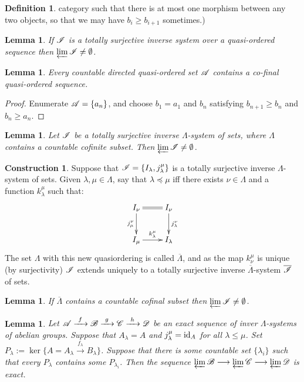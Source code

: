 \documentclass[11pt]{article}
\theoremstyle{plain}
\newtheorem{lem}[thm]{Lemma}
\theoremstyle{definition}
\newtheorem{const}[thm]{Construction}
\newtheorem{defn}[thm]{Definition}
\begin{document}
{\begin{defn}
category such that there is at most one morphism between any two objects, so
that we may have $b_i\geq b_{i+1}$ sometimes.)
\end{defn}
\begin{lem}
If $\mathscr{I}$ is a totally surjective inverse system over a quasi-ordered sequence
then $\varprojlim\mathscr{I}\neq\emptyset$.
\end{lem}
\begin{lem}
Every countable directed quasi-ordered set $\mathscr{A}$ contains a co-final
quasi-ordered sequence.
\end{lem}
\begin{proof}
Enumerate $\mathscr{A}=\{a_n\}$, and choose $b_1=a_1$ and $b_n$ satisfying
$b_{n+1}\geq b_n$ and $b_n\geq a_n$.
\end{proof}
\begin{lem}
Let $\mathscr{I}$ be a totally surjective inverse $\Lambda$-system of sets, where
$\Lambda$ contains a countable cofinite subset. Then
$\varprojlim\mathscr{I}\neq\emptyset$.
\end{lem}
\begin{const}
Suppose that $\mathscr{I}=\{I_\lambda,j_\lambda^\mu\}$ is a totally surjective inverse
$\Lambda$-system of sets. Given $\lambda,\mu\in\Lambda$, say that
$\lambda\preceq\mu$ iff there exists $\nu\in\Lambda$ and a function
$k^\mu_\lambda$ such that:
\[\xymatrix{
I_\nu\ar[d]_{j^\nu_\mu}&I_\nu\ar@{=}[l]\ar[d]^{j^\nu_\lambda}\\
I_\mu\ar[r]^{k_\lambda^\mu}&I_\lambda
}\]
The set $\Lambda$ with this new quasiordering is called $\overline\Lambda$, and
as the map $k^\mu_\nu$ is unique (by surjectivity) $\mathscr{I}$ extends uniquely to a
totally surjective inverse $\overline\Lambda$-system $\overline{\mathscr{I}}$ of sets.
\end{const}
\begin{lem}
If $\overline\Lambda$ contains a countable cofinal subset then
$\varprojlim\mathscr{I}\neq\emptyset$.
\end{lem}
\begin{lem}
Let $\scrA\xrightarrow{\ f\ }\scrB\xrightarrow{\ g\ }\scrC\xrightarrow{\ h\
}\scrD$ be an exact sequence of inver $\Lambda$-systems of abelian groups.
Suppose that $A_\lambda=A$ and $j_\lambda^\mu=\textup{id}_A$ for all $\lambda\leq\mu$.
Set $P_\lambda:=\ker\{A=A_\lambda\xrightarrow{\ f_\lambda\ } B_\lambda\}$.
Suppose that there is some countable set $\{\lambda_i\}$ such that every
$P_\lambda$ contains some $P_{\lambda_i}$. Then the sequence $\varprojlim
\mathscr{B}\longrightarrow\varprojlim \mathscr{C}\longrightarrow\varprojlim \mathscr{D}$ is exact.
\end{lem}
}
\end{document}
